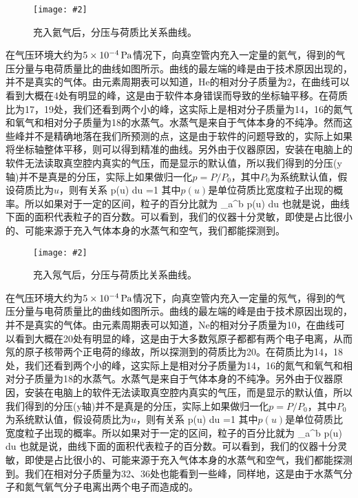 \documentclass{ctexart}
\newcommand{\cpic}[2]{
\begin{center}
\texttt{[image: \#2]}
\end{center}
}
\newcommand{\cpicn}[3]
{
\begin{figure}[H]
\cpic{#1}{#2}
\caption{#3\label{#2}}
\end{figure}
}
\begin{document}
\cpicn{0.3}{He.PNG}{\color{red} 充入氦气后，分压与荷质比关系曲线。}
\par 在气压环境大约为$5\times 10^{-4}\,\mathrm{Pa}$情况下，向真空管内充入一定量的氦气，得到的气压分量与电荷质量比的曲线如图所示。曲线的最左端的峰是由于技术原因出现的，并不是真实的气体。由元素周期表可以知道，He的相对分子质量为2，在曲线可以看到大概在4处有明显的峰，这是由于软件本身错误而导致的坐标轴平移。在荷质比为17，19处，我们还看到两个小的峰，这实际上是相对分子质量为14，16的氮气和氧气和相对分子质量为18的水蒸气。水蒸气是来自于气体本身的不纯净。然而这些峰并不是精确地落在我们所预测的点，这是由于软件的问题导致的，实际上如果将坐标轴整体平移，则可以得到精准的曲线。另外由于仪器原因，安装在电脑上的软件无法读取真空腔内真实的气压，而是显示的默认值，所以我们得到的分压(y轴)并不是真是的分压，实际上如果做归一化$p = P/P_0$，其中$P_0$为系统默认值，假设荷质比为$u$，则有关系
\beq
\int p(u) du =1
\eeq
其中$p(u)$是单位荷质比宽度粒子出现的概率。所以如果对于一定的区间，粒子的百分比就为
\beq
\int_a^b p(u) du
\eeq
也就是说，曲线下面的面积代表粒子的百分数。可以看到，我们的仪器十分灵敏，即使是占比很小的、可能来源于充入气体本身的水蒸气和空气，我们都能探测到。

\cpicn{0.3}{Ne.PNG}{\color{red} 充入氖气后，分压与荷质比关系曲线。}
\par 在气压环境大约为$5\times 10^{-4}\,\mathrm{Pa}$情况下，向真空管内充入一定量的氖气，得到的气压分量与电荷质量比的曲线如图所示。曲线的最左端的峰是由于技术原因出现的，并不是真实的气体。由元素周期表可以知道，Ne的相对分子质量为10，在曲线可以看到大概在20处有明显的峰，这是由于大多数氖原子都都有两个电子电离，从而氖的原子核带两个正电荷的缘故，所以探测到的荷质比为20。在荷质比为14，18处，我们还看到两个小的峰，这实际上是相对分子质量为14，16的氮气和氧气和相对分子质量为18的水蒸气。水蒸气是来自于气体本身的不纯净。另外由于仪器原因，安装在电脑上的软件无法读取真空腔内真实的气压，而是显示的默认值，所以我们得到的分压(y轴)并不是真是的分压，实际上如果做归一化$p = P/P_0$，其中$P_0$为系统默认值，假设荷质比为$u$，则有关系
\beq
\int p(u) du =1
\eeq
其中$p(u)$是单位荷质比宽度粒子出现的概率。所以如果对于一定的区间，粒子的百分比就为
\beq
\int_a^b p(u) du
\eeq
也就是说，曲线下面的面积代表粒子的百分数。可以看到，我们的仪器十分灵敏，即使是占比很小的、可能来源于充入气体本身的水蒸气和空气，我们都能探测到。我们在相对分子质量为32、36处也能看到一些峰，同样地，这是由于水蒸气分子和氮气氧气分子电离出两个电子而造成的。
\end{document}
